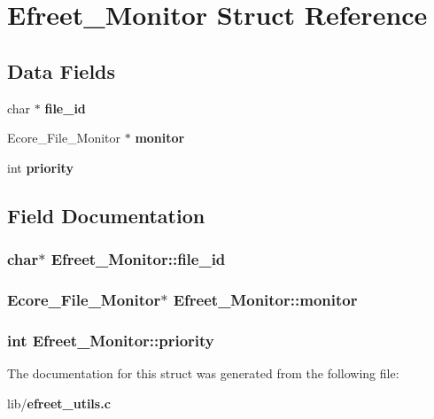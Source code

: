 \section{Efreet\_\-Monitor Struct Reference}
\label{structEfreet__Monitor}
\subsection*{Data Fields}
\begin{CompactItemize}
\item 
char $\ast$ {\bf file\_\-id}
\item 
Ecore\_\-File\_\-Monitor $\ast$ {\bf monitor}
\item 
int {\bf priority}
\end{CompactItemize}


\subsection{Field Documentation}
\subsubsection[file\_\-id]{\setlength{\rightskip}{0pt plus 5cm}char$\ast$ {\bf Efreet\_\-Monitor::file\_\-id}}\label{structEfreet__Monitor_7f26a3b08d48d6768c0afbf96b83b69f}


\subsubsection[monitor]{\setlength{\rightskip}{0pt plus 5cm}Ecore\_\-File\_\-Monitor$\ast$ {\bf Efreet\_\-Monitor::monitor}}\label{structEfreet__Monitor_7c78d446e9c619d4afaeaf1c0cb609e9}


\subsubsection[priority]{\setlength{\rightskip}{0pt plus 5cm}int {\bf Efreet\_\-Monitor::priority}}\label{structEfreet__Monitor_8056cc07aac3807b09e26849dfbd08e2}




The documentation for this struct was generated from the following file:\begin{CompactItemize}
\item 
lib/{\bf efreet\_\-utils.c}\end{CompactItemize}
